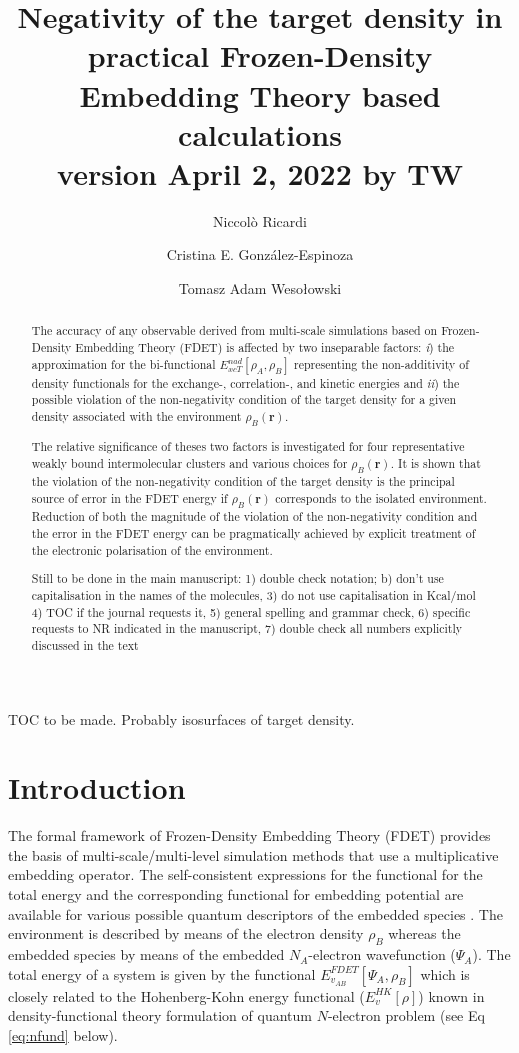 \documentclass[journal=jctcce,manuscript=article]{achemso}
\author{Niccol\`{o} Ricardi}
\author{Cristina E. Gonz\'{a}lez-Espinoza}
\author{Tomasz Adam Weso\l{}owski}
\affiliation[University of Geneva]
{Department of Physical Chemistry, University of Geneva, Geneva (Switzerland)}
\title[Negativity of the target density]
  {Negativity of the target density in practical Frozen-Density Embedding Theory based calculations\\
  version April 2, 2022 by TW}
\begin{document}
\begin{tocentry}

TOC to be made. Probably isosurfaces of target density.

\end{tocentry}

\begin{abstract}
The accuracy of any observable derived from multi-scale simulations based on Frozen-Density Embedding Theory (FDET) is affected by two inseparable factors: {\it i}) the approximation for the bi-functional ${E}_{xcT}^{nad}[\rho_A,\rho_B]$ representing the non-additivity of density functionals for the exchange-, correlation-, and kinetic  energies and  {\it ii}) the possible violation of the non-negativity condition of the target density for a given density associated with the environment $\rho_B(\mathbf{r})$.

The relative significance of theses two factors is investigated for four representative weakly bound intermolecular clusters and various choices for $\rho_B(\mathbf{r})$.
It is shown that  the violation of the non-negativity condition of the target density is the principal source of error in the FDET energy
if $\rho_B(\mathbf{r})$ corresponds to the isolated environment.
Reduction of both the magnitude of the violation of the non-negativity condition and the error in the FDET energy can be pragmatically achieved by explicit treatment of the electronic polarisation of the environment.

{\color{red} Still to be done in the main manuscript:
1) double check notation; b) don't use capitalisation in the names of the molecules, 3) do not use capitalisation in Kcal/mol
4) TOC if the journal requests it, 5) general spelling and grammar check, 6) specific requests to NR indicated in the manuscript, 7) double check all numbers explicitly discussed in the text
} 
\end{abstract}


\section{Introduction}
The formal framework of 
Frozen-Density Embedding Theory (FDET) provides the basis of multi-scale/multi-level simulation methods that use a multiplicative embedding operator. The self-consistent expressions for the functional for the total energy and the corresponding functional for embedding potential are available for  various possible quantum descriptors of the embedded species \cite{Wesolowski1993,Wesolowski2008,Pernal2009,Wesolowski2015,Wesolowski2020}. 
The environment is described by means of the electron density $\rho_B$ whereas the embedded species by means of the 
embedded $N_A$-electron wavefunction ($\Psi_A$). The total energy of a system is given by the functional ${E}_{v_{AB}}^{FDET}[\Psi_{A},\rho_B]$ which is closely related to the Hohenberg-Kohn energy functional ($E_v^{HK}[\rho]$) known in density-functional theory \cite{Hohenberg1964} formulation of quantum $N$-electron problem (see Eq \ref{eq:nfund} below).
\end{document}
